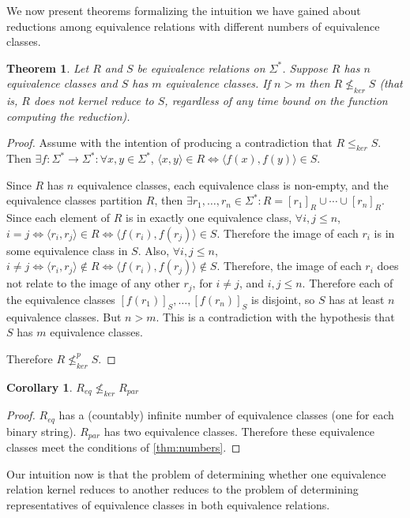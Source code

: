 \documentclass{article}
\newtheorem{theorem}{Theorem}[section]
\newtheorem{corollary}[corollary]{Corollary}
\theoremstyle{definition} \newtheorem{definition}[definition]{Definition}
\newcommand{\sigmastar}{\Sigma^{*}} %
\newcommand{\nkr}{\nleq^{p}_{ker}} %
\newcommand{\krnt}{\leq_{ker}} %
\newcommand{\nkrnt}{\nleq_{ker}} %
\newcommand{\pair}[2]{\langle#1,#2\rangle} %
\begin{document}
We now present theorems formalizing the intuition we have gained about
reductions among equivalence relations with different numbers of equivalence
classes.
\begin{theorem}\label{thm:numbers}
  Let $R$ and $S$ be equivalence relations on $\sigmastar$. Suppose $R$ has $n$
  equivalence classes and $S$ has $m$ equivalence classes. If $n>m$ then
  $R\nkrnt S$ (that is, $R$ does not kernel reduce to $S$, regardless of any
  time bound on the function computing the reduction).
\end{theorem}
\begin{proof}
  Assume with the intention of producing a contradiction that $R\krnt S$. Then
  $\exists f\colon\sigmastar\to\sigmastar:\forall x,y\in\sigmastar$,
  $\pair{x}{y}\in R\iff \pair{f(x)}{f(y)}\in S$.

  Since $R$ has $n$ equivalence classes, each equivalence class is non-empty,
  and the equivalence classes partition $R$, then $\exists
  r_1,\ldots,r_n\in\sigmastar: R=[r_1]_R\cup\cdots\cup[r_n]_R$.  Since each
  element of $R$ is in exactly one equivalence class, $\forall i,j\leq n$,
  $i=j\iff\pair{r_i}{r_j}\in R\iff\pair{f(r_i)}{f(r_j)}\in S$. Therefore the
  image of each $r_i$ is in some equivalence class in $S$.  Also, $\forall
  i,j\leq n$, $i\neq j\iff \pair{r_i}{r_j}\notin R\iff
  \pair{f(r_i)}{f(r_j)}\notin S$. Therefore, the image of each $r_i$ does not
  relate to the image of any other $r_j$, for $i\neq j$, and $i,j\leq
  n$. Therefore each of the equivalence classes $[f(r_1)]_S,\ldots,[f(r_n)]_S$
  is disjoint, so $S$ has at least $n$ equivalence classes. But $n>m$. This is
  a contradiction with the hypothesis that $S$ has $m$ equivalence classes.

  Therefore $R\nkr S$.
\end{proof}

\begin{corollary}
  $R_{eq}\nkrnt R_{par}$
\end{corollary}
\begin{proof}
  $R_{eq}$ has a (countably) infinite number of equivalence classes (one for
  each binary string). $R_{par}$ has two equivalence classes. Therefore these
  equivalence classes meet the conditions of \autoref{thm:numbers}.
\end{proof}

Our intuition now is that the problem of determining whether one equivalence
relation kernel reduces to another reduces to the problem of determining
representatives of equivalence classes in both equivalence relations.
\end{document}
